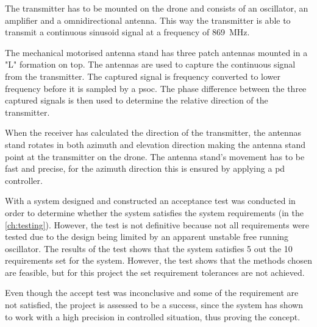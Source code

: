 The transmitter has to be mounted on the drone and consists of an oscillator, an amplifier and a omnidirectional antenna. This way the transmitter is able to transmit a continuous sinusoid signal at a frequency of \SI{869}{\mega\hertz}. 

The mechanical motorised antenna stand has three patch antennas mounted in a "L" formation on top. The antennas are used to capture the continuous signal from the transmitter. The captured signal is frequency converted to lower frequency before it is sampled by a \gls{psoc}. The phase difference between the three captured signals is then used to determine the relative direction of the transmitter. 

When the receiver has calculated the direction of the transmitter, the antennas stand rotates in both azimuth and elevation direction making the antenna stand point at the transmitter on the drone. The antenna stand's movement has to be fast and precise, for the azimuth direction this is ensured by applying a \gls{pd} controller. 

With a system designed and constructed an acceptance test was conducted in order to determine whether the system satisfies the system requirements (in the \autoref{ch:testing}). However, the test is not definitive because not all requirements were tested due to the design being limited by an apparent unstable free running oscillator. The results of the test shows that the system satisfies 5 out the 10 requirements set for the system. However, the test shows that the methods chosen are feasible, but for this project the set requirement tolerances are not achieved. 

Even though the accept test was inconclusive and some of the requirement are not satisfied, the project is assessed to be a success, since the system has shown to work with a high precision in controlled situation, thus proving the concept. 